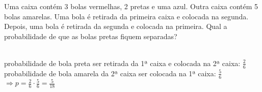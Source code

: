 \begin{ex}
Uma caixa contém 3 bolas vermelhas, 2 pretas e uma azul. Outra caixa contém 5 bolas amarelas. Uma bola é retirada da primeira caixa e colocada na segunda. Depois, uma bola é retirada da segunda e colocada na primeira. Qual a probabilidade de que as bolas pretas fiquem separadas?
 \begin{sol}
   \phantom{A} \\
   probabilidade de bola preta ser retirada da 1ª caixa e colocada na 2ª caixa: $\frac{2}{6}$  \\
   probabilidade de bola amarela da 2ª caixa ser colocada na 1ª caixa: $\frac{5}{6}$ \\
   $\Longrightarrow p = \frac{2}{6}\cdot\frac{5}{6}= \frac{5}{18}$
 \end{sol}
\end{ex}